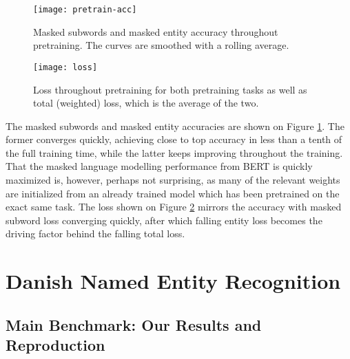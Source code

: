 \documentclass[main.tex]{subfiles}
\begin{document}
\begin{figure}[H]
    \centering
    \texttt{[image: pretrain-acc]}
    \caption{Masked subwords and masked entity accuracy throughout pretraining.
    The curves are smoothed with a rolling average.}
    \label{fig:pretrain-acc}
\end{figure}\noindent

\begin{figure}[H]
    \centering
    \texttt{[image: loss]}
    \caption{Loss throughout pretraining for both pretraining tasks as well as total (weighted) loss, which is the average of the two.}
    \label{fig:loss}
\end{figure}\noindent
The masked subwords and masked entity accuracies are shown on Figure \ref{fig:pretrain-acc}.
The former converges quickly, achieving close to top accuracy in less than a tenth of the full training time, while the latter keeps improving throughout the training.
That the masked language modelling performance from BERT is quickly maximized is, however, perhaps not surprising, as many of the relevant weights are initialized from an already trained model which has been pretrained on the exact same task.
The loss shown on Figure \ref{fig:loss} mirrors the accuracy with masked subword loss converging quickly, after which falling entity loss becomes the driving factor behind the falling total loss.

\section{Danish Named Entity Recognition}%
\label{sec:nerres}
\subsection{Main Benchmark: Our Results and Reproduction}




\end{document}
